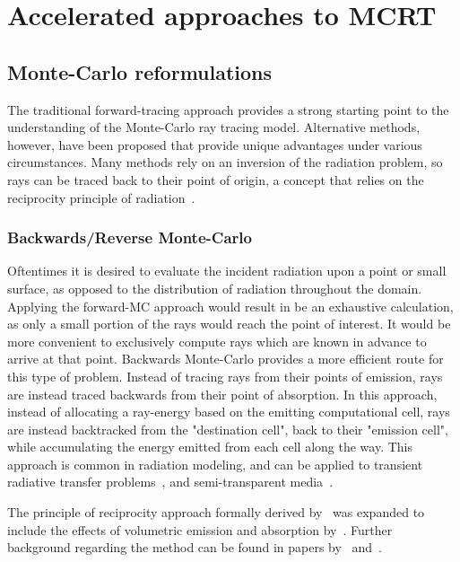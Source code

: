\section{Accelerated approaches to MCRT}

\subsection{Monte-Carlo reformulations}\label{section:reformulations}
The traditional forward-tracing approach provides a strong starting point to the understanding of the Monte-Carlo ray tracing model. Alternative methods, however, have been proposed that provide unique advantages under various circumstances.
Many methods rely on an inversion of the radiation problem, so rays can be traced back to their point of origin, a concept that relies on the reciprocity principle of radiation~\cite{Case1957TransferPrinciple}.

\subsubsection{Backwards/Reverse Monte-Carlo}
Oftentimes it is desired to evaluate the incident radiation upon a point or small surface, as opposed to the distribution of radiation throughout the domain.
Applying the forward-MC approach would result in be an exhaustive calculation, as only a small portion of the rays would reach the point of interest. It would be more convenient to exclusively compute rays which are known in advance to arrive at that point. 
Backwards Monte-Carlo provides a more efficient route for this type of problem.
Instead of tracing rays from their points of emission, rays are instead traced backwards from their point of absorption.
In this approach, instead of allocating a ray-energy based on the emitting computational cell, rays are instead backtracked from the "destination cell", back to their "emission cell", while accumulating the energy emitted from each cell along the way.
This approach is common in radiation modeling, and can be applied to transient radiative transfer problems~\cite{Lu2004ReverseMedia}, and semi-transparent media~\cite{Li2005BackwardSlab}.

The principle of reciprocity approach formally derived by~\citet{Case1957TransferPrinciple} was expanded to include the effects of volumetric emission and absorption by~\citet{Walters1992RigorousMedia}.
Further background regarding the method can be found in papers by~\citet{Modest2003BackwardTransfer} and~\citet{Howell2010ThermalTransfer}.

